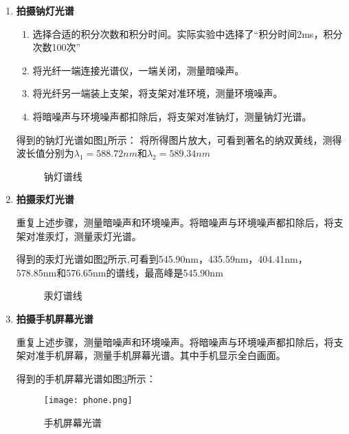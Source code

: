 \documentclass[dvipsnames, svgnames,a4paper,11pt]{article}
\begin{document}
		\begin{enumerate}
			\item \textbf{拍摄钠灯光谱}
				\begin{enumerate}
					\item 选择合适的积分次数和积分时间。实际实验中选择了“积分时间2ms，积分次数100次”
					
					\item 将光纤一端连接光谱仪，一端关闭，测量暗噪声。 
					
					\item 将光纤另一端装上支架，将支架对准环境，测量环境噪声。
					
					\item 将暗噪声与环境噪声都扣除后，将支架对准钠灯，测量钠灯光谱。
					
				\end{enumerate}
				
				得到的钠灯光谱如图\ref{fig:Na-1}所示：
				将所得图片放大，可看到著名的纳双黄线，测得波长值分别为$\lambda_1=588.72nm$和$\lambda_2=589.34nm$
				
				\begin{figure}[htbp]
					\centering
					\caption{钠灯谱线}
					\label{fig:Na-1}			
				\end{figure}
				
				
				
			\item \textbf{拍摄汞灯光谱}
			
				重复上述步骤，测量暗噪声和环境噪声。将暗噪声与环境噪声都扣除后，将支架对准汞灯，测量汞灯光谱。
				
				
				得到的汞灯光谱如图\ref{fig:Hg-1}所示,可看到545.90nm，435.59nm，404.41nm，578.85nm和576.65nm的谱线，最高峰是545.90nm
				
				\begin{figure}[htbp]
					\centering
					\caption{汞灯谱线}
					\label{fig:Hg-1}			
				\end{figure}
				
				
			\item \textbf{拍摄手机屏幕光谱}
			
				重复上述步骤，测量暗噪声和环境噪声。将暗噪声与环境噪声都扣除后，将支架对准手机屏幕，测量手机屏幕光谱。其中手机显示全白画面。
				
				得到的手机屏幕光谱如图\ref{fig:phone}所示：
				
				\begin{figure}[htbp]
					\centering
					\texttt{[image: phone.png]}
					\caption{手机屏幕光谱}
					\label{fig:phone}
				\end{figure}
		\end{enumerate}
		
\end{document}
